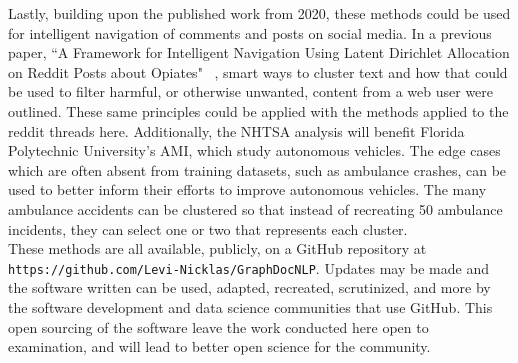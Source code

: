 Lastly, building upon the published work from 2020, these methods could be used for intelligent navigation of comments and posts on social media. In a previous paper, ``A Framework for Intelligent Navigation Using Latent Dirichlet Allocation on Reddit Posts about Opiates" ~\cite{akioyamen2020framework}, smart ways to cluster text and how that could be used to filter harmful, or otherwise unwanted, content from a web user were outlined. These same principles could be applied with the methods applied to the reddit threads here. Additionally, the NHTSA analysis will benefit Florida Polytechnic University's AMI, which study autonomous vehicles. The edge cases which are often absent from training datasets, such as ambulance crashes, can be used to better inform their efforts to improve autonomous vehicles. The many ambulance accidents can be clustered so that instead of recreating 50 ambulance incidents, they can select one or two that represents each cluster. \\

These methods are all available, publicly, on a GitHub repository at \texttt{https://github.com/Levi-Nicklas/GraphDocNLP}. Updates may be made and the software written can be used, adapted, recreated, scrutinized, and more by the software development and data science communities that use GitHub. This open sourcing of the software leave the work conducted here open to examination, and will lead to better open science for the community.

\nocite{vishwanathan2010graph}
\nocite{kriege2020survey}
\nocite{nikolentzos2017shortest}
\nocite{kondor2002diffusion}
\nocite{vazirgiannis2018graphrep}
\nocite{cheng2006n}
\nocite{rosenfeld2020kernel}
\nocite{akioyamen2020framework}
\nocite{wickham2019welcome}
\nocite{sugiyama2018graphkernels}
\nocite{sugiyama2015halting}
\nocite{csardi2013package}
\nocite{csardi2006igraph}
\nocite{silge2016tidytext}
\nocite{rivera2015package}
\nocite{wickham2010stringr}
\nocite{bengtsson2020unifying}







